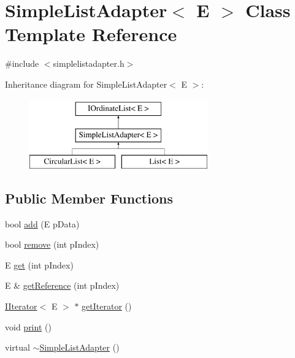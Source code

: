 \hypertarget{class_simple_list_adapter}{\section{Simple\-List\-Adapter$<$ E $>$ Class Template Reference}
\label{class_simple_list_adapter}
}


{\ttfamily \#include $<$simplelistadapter.\-h$>$}

Inheritance diagram for Simple\-List\-Adapter$<$ E $>$\-:\begin{figure}[H]
\begin{center}
\leavevmode
\includegraphics[height=3.000000cm]{class_simple_list_adapter}
\end{center}
\end{figure}
\subsection*{Public Member Functions}
\begin{DoxyCompactItemize}
\item 
bool \hyperlink{class_simple_list_adapter_a659e4b834a3d5dc46e25665c7809a3d8}{add} (E p\-Data)
\item 
bool \hyperlink{class_simple_list_adapter_a459ccf5fdce99a9b6dade7d187fb2e8d}{remove} (int p\-Index)
\item 
E \hyperlink{class_simple_list_adapter_a0dd35a961e4c7311cb82c11782340667}{get} (int p\-Index)
\item 
E \& \hyperlink{class_simple_list_adapter_aa548a9578aa7288205982062834e00e9}{get\-Reference} (int p\-Index)
\item 
\hyperlink{class_i_iterator}{I\-Iterator}$<$ E $>$ $\ast$ \hyperlink{class_simple_list_adapter_a32e8dd965e56d402fe5b450ecc7c7d3c}{get\-Iterator} ()
\item 
void \hyperlink{class_simple_list_adapter_ae2e5fe821e64b93c93eeda590d31f5f2}{print} ()
\item 
virtual \hyperlink{class_simple_list_adapter_a8bc601004a917aa5823bb5117391ddd6}{$\sim$\-Simple\-List\-Adapter} ()
\end{DoxyCompactItemize}
